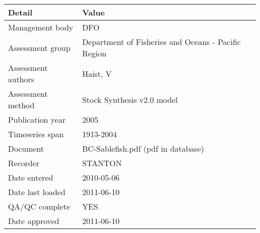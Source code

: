 \begin{table}[htb]
\centering
\begin{tabular}{lp{7cm}}
\toprule
Detail & Value \\
\midrule
Management body    & DFO                                                 \\
Assessment group   & Department of Fisheries and Oceans - Pacific Region \\
Assessment authors & Haist, V                                            \\
Assessment method  & Stock Synthesis v2.0 model                          \\
Publication year   & 2005                                                \\
Timeseries span    & 1913-2004                                           \\
Document           & BC-Sablefish.pdf (pdf in database)                  \\
Recorder           & STANTON                                             \\
Date entered       & 2010-05-06                                          \\
Date last loaded   & 2011-06-10                                          \\
QA/QC complete     & YES                                                 \\
Date approved      & 2011-06-10                                          \\
\bottomrule
\end{tabular}
\label{tab:assessdet}
\end{table}
